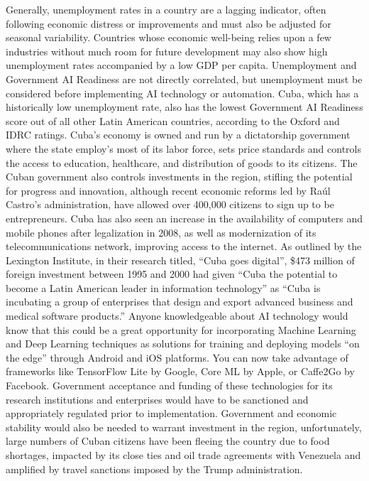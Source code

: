\documentclass[journal]{IEEEtran}
\begin{document}
Generally, unemployment rates in a country are a lagging indicator, often following economic distress or improvements and must also be adjusted for seasonal variability. Countries whose economic well-being relies upon a few industries without much room for future development may also show high unemployment rates accompanied by a low GDP per capita. Unemployment and Government AI Readiness are not directly correlated, but unemployment must be considered before implementing AI technology or automation.
Cuba, which has a historically low unemployment rate, also has the lowest Government AI Readiness score out of all other Latin American countries, according to the Oxford and IDRC ratings. Cuba’s economy is owned and run by a dictatorship government where the state employ’s most of its labor force, sets price standards and controls the access to education, healthcare, and distribution of goods to its citizens. The Cuban government also controls investments in the region, stifling the potential for progress and innovation, although recent economic reforms led by Raúl Castro’s administration, have allowed over 400,000 citizens to sign up to be entrepreneurs.
Cuba has also seen an increase in the availability of computers and mobile phones after legalization in 2008, as well as modernization of its telecommunications network, improving access to the internet. As outlined by the Lexington Institute, in their research titled, “Cuba goes digital”, \$473 million of foreign investment between 1995 and 2000 had given “Cuba the potential to become a Latin American leader in information technology” as “Cuba is incubating a group of enterprises that design and export advanced business and medical software products.” Anyone knowledgeable about AI technology would know that this could be a great opportunity for incorporating Machine Learning and Deep Learning techniques as solutions for training and deploying models “on the edge” through Android and iOS platforms. You can now take advantage of frameworks like TensorFlow Lite by Google, Core ML by Apple, or Caffe2Go by Facebook.
Government acceptance and funding of these technologies for its research institutions and enterprises would have to be sanctioned and appropriately regulated prior to implementation. Government and economic stability would also be needed to warrant investment in the region, unfortunately, large numbers of Cuban citizens have been fleeing the country due to food shortages, impacted by its close ties and oil trade agreements with Venezuela and amplified by travel sanctions imposed by the Trump administration.
\end{document}
